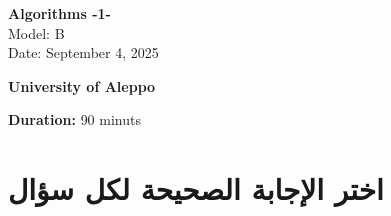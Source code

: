 \documentclass[12pt]{article}
\begin{document}
\begin{flushright}
{\Large \textbf{{\textenglish{Algorithms -1-}}}}\\[0.25em]
{\normalsize \textenglish{Model: }{\textenglish{B}}}\\[0.1em]
{\normalsize \textenglish{Date: }{\textenglish{September 4, 2025}}}
\end{flushright}

\vspace{0.6cm}

\noindent
\begin{minipage}[t]{0.65\textwidth}
  \raggedright
  \textbf{{\textenglish{University of Aleppo}}}\\[0.3em]
\end{minipage}\hfill
\begin{minipage}[t]{0.3\textwidth}
  \raggedleft
  \textenglish{\textbf{Duration: }}{\textenglish{90 minuts}}
\end{minipage}

\vspace{0.9cm}

\section*{اختر الإجابة الصحيحة لكل سؤال}
\end{document}
